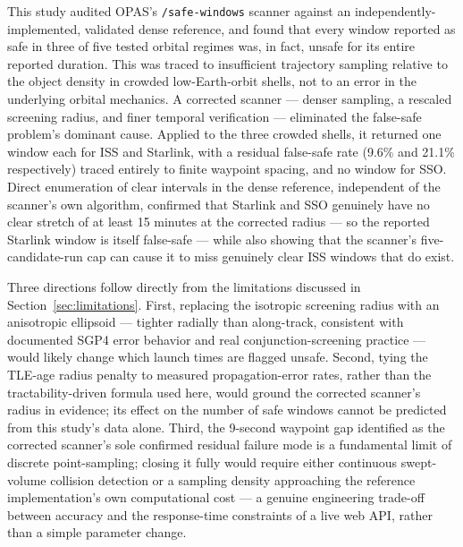 \documentclass[11pt,a4paper]{article}
\begin{document}
This study audited OPAS's \texttt{/safe-windows} scanner against an
independently-implemented, validated dense reference, and found that every
window reported as safe in three of five tested orbital regimes was, in
fact, unsafe for its entire reported duration. This was traced to
insufficient trajectory sampling relative to the object density in crowded
low-Earth-orbit shells, not to an error in the underlying orbital
mechanics. A corrected scanner --- denser sampling, a rescaled screening
radius, and finer temporal verification --- eliminated the false-safe
problem's dominant cause. Applied to the three crowded shells, it returned
one window each for ISS and Starlink, with a residual false-safe rate (9.6\%
and 21.1\% respectively) traced entirely to finite waypoint spacing, and no
window for SSO. Direct enumeration of clear intervals in the dense
reference, independent of the scanner's own algorithm, confirmed that
Starlink and SSO genuinely have no clear stretch of at least 15 minutes at
the corrected radius --- so the reported Starlink window is itself
false-safe --- while also showing that the scanner's five-candidate-run cap
can cause it to miss genuinely clear ISS windows that do exist.

Three directions follow directly from the limitations discussed in
Section~\ref{sec:limitations}. First, replacing the isotropic screening
radius with an anisotropic ellipsoid --- tighter radially than along-track,
consistent with documented SGP4 error behavior and real conjunction-screening
practice --- would likely change which launch times are flagged unsafe.
Second, tying the TLE-age radius penalty to measured propagation-error rates,
rather than the tractability-driven formula used here, would ground the
corrected scanner's radius in evidence; its effect on the number of safe
windows cannot be predicted from this study's data alone. Third, the
9-second waypoint gap identified as the corrected scanner's sole confirmed
residual failure mode is a fundamental limit of discrete point-sampling;
closing it fully would require either continuous swept-volume collision
detection or a sampling density approaching the reference implementation's
own computational cost --- a genuine engineering trade-off between accuracy
and the response-time constraints of a live web API, rather than a simple
parameter change.
\end{document}
